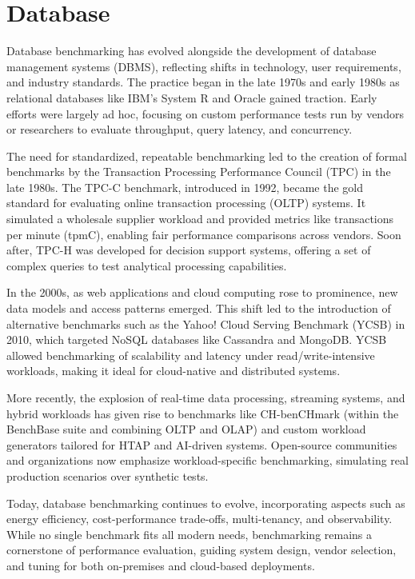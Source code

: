 \section{Database}



Database benchmarking has evolved alongside the development of database management systems (DBMS), reflecting shifts in technology, user requirements, and industry standards. The practice began in the late 1970s and early 1980s as relational databases like IBM's System R\cite{Orlowski2013IBMSystemR} and Oracle gained traction. Early efforts were largely ad hoc, focusing on custom performance tests run by vendors or researchers to evaluate throughput, query latency, and concurrency.

The need for standardized, repeatable benchmarking led to the creation of formal benchmarks by the Transaction Processing Performance Council (TPC)\cite{wikipedia-TPC} in the late 1980s. The TPC-C benchmark, introduced in 1992, became the gold standard for evaluating online transaction processing (OLTP) systems. It simulated a wholesale supplier workload and provided metrics like transactions per minute (tpmC), enabling fair performance comparisons across vendors. Soon after, TPC-H was developed for decision support systems, offering a set of complex queries to test analytical processing capabilities.

In the 2000s, as web applications and cloud computing rose to prominence, new data models and access patterns emerged. This shift led to the introduction of alternative benchmarks such as the Yahoo! Cloud Serving Benchmark (YCSB) \cite{wikipedia-YCSB} in 2010, which targeted NoSQL databases like Cassandra and MongoDB. YCSB allowed benchmarking of scalability and latency under read/write-intensive workloads, making it ideal for cloud-native and distributed systems.

More recently, the explosion of real-time data processing, streaming systems, and hybrid workloads has given rise to benchmarks like CH-benCHmark\cite{tum.de-CH-benCHmark} (within the BenchBase suite\cite{cmu-db-BenchBase} and combining OLTP and OLAP) and custom workload generators tailored for HTAP and AI-driven systems. Open-source communities and organizations now emphasize workload-specific benchmarking, simulating real production scenarios over synthetic tests.

Today, database benchmarking continues to evolve, incorporating aspects such as energy efficiency, cost-performance trade-offs, multi-tenancy, and observability. While no single benchmark fits all modern needs, benchmarking remains a cornerstone of performance evaluation, guiding system design, vendor selection, and tuning for both on-premises and cloud-based deployments.

